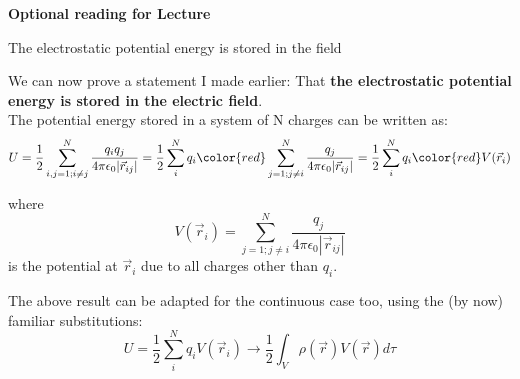%
%

\begin{frame}[plain,c]
\begin{center}
{\Huge \bf Optional reading for Lecture \thislecture}
\end{center}
\end{frame}


%
%
%

\begin{frame}{The electrostatic potential energy is stored in the field}

We can now prove a statement I made earlier: That {\bf the electrostatic potential energy is stored in the electric field}.\\
\vspace{0.1cm}
The potential energy stored in a system of N charges can be written as:
\begin{equation*}
   U = \frac{1}{2} \sum_{i,j=1;i{\ne}j}^{N} \frac{q_i q_j}{4\pi\epsilon_0|\vec{r}_{ij}|}
     = \frac{1}{2} \sum_{i}^{N} q_i {\color{red}\sum_{j=1;j{\ne}i}^{N} \frac{q_j}{4\pi\epsilon_0|\vec{r}_{ij}|}}
     = \frac{1}{2} \sum_{i}^{N} q_i {\color{red}V(\vec{r}_{i})}
\end{equation*}

where
\begin{equation*}
   V(\vec{r}_{i}) = \sum_{j=1;j{\ne}i}^{N} \frac{q_j}{4\pi\epsilon_0|\vec{r}_{ij}|}
\end{equation*}
is the potential at $\vec{r}_{i}$ due to all charges other than $q_i$.\\

\vspace{0.2cm}

The above result can be adapted for the continuous case too, using the (by now) familiar substitutions:
\begin{equation*}
   U = \frac{1}{2} \sum_{i}^{N} q_i V(\vec{r}_{i}) \rightarrow \frac{1}{2} \int_{V} \rho(\vec{r}) V(\vec{r}) d\tau
\end{equation*}

\end{frame}

%
%
%

